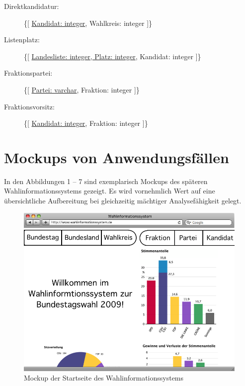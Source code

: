 \documentclass[a4paper]{article}
\begin{document}
\begin{description}

\item[Direktkandidatur:] \{[ \underline{Kandidat: integer}, Wahlkreis: integer ]\}

\item[Listenplatz:] \{[ \underline{Landesliste: integer, Platz: integer}, Kandidat: integer ]\}

\item[Fraktionspartei:] \{[ \underline{Partei: varchar}, Fraktion: integer ]\}

\item[Fraktionsvorsitz:] \{[ \underline{Kandidat: integer}, Fraktion: integer ]\}

\end{description}

\section{Mockups von Anwendungsfällen}

In den Abbildungen 1 -- 7 sind exemplarisch Mockups des späteren Wahlinformationssystems gezeigt. Es wird vornehmlich Wert auf eine übersichtliche Aufbereitung bei gleichzeitig mächtiger Analysefähigkeit gelegt.

\begin{figure}[!h]
\centering
\includegraphics[scale=0.4]{Mockups/startseite}
\caption{Mockup der Startseite des Wahlinformationssystems}
\end{figure}
\end{document}
